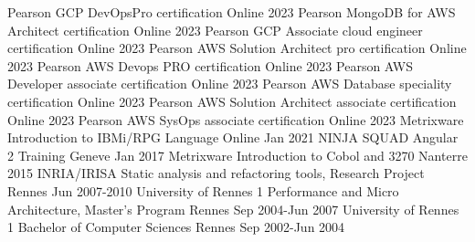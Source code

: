 
\begin{cventries}
\cventry
{Pearson} %
{GCP DevOpsPro certification} %
{Online} %
{2023} %
{
}\cventry
{Pearson} %
{MongoDB for AWS Architect certification} %
{Online} %
{2023} %
{
}\cventry
{Pearson} %
{GCP Associate cloud engineer certification} %
{Online} %
{2023} %
{
}
\cventry
{Pearson} %
{AWS Solution Architect pro certification} %
{Online} %
{2023} %
{
}
\cventry
{Pearson} %
{AWS Devops PRO certification} %
{Online} %
{2023} %
{
}
\cventry
{Pearson} %
{AWS Developer associate certification} %
{Online} %
{2023} %
{
}
\cventry
{Pearson} %
{AWS Database speciality certification} %
{Online} %
{2023} %
{
}
\cventry
{Pearson} %
{AWS Solution Architect associate certification} %
{Online} %
{2023} %
{
}
\cventry
{Pearson} %
{AWS SysOps associate certification} %
{Online} %
{2023} %
{
}
\cventry
{Metrixware} %
{Introduction to IBMi/RPG Language} %
{Online} %
{Jan 2021} %
{
}
\cventry
{NINJA SQUAD} %
{Angular 2 Training} %
{Geneve} %
{Jan 2017} %
{
}
\cventry
{Metrixware} %
{Introduction to Cobol and 3270} %
{Nanterre} %
{2015} %
{
}
\cventry
{INRIA/IRISA} %
{Static analysis and refactoring tools, Research Project} %
{Rennes} %
{Jun 2007-2010} %
{
}
\cventry
{University of Rennes 1} %
{Performance and Micro Architecture, Master's Program} %
{Rennes} %
{Sep 2004-Jun 2007} %
{
}
\cventry
{University of Rennes 1} %
{Bachelor of Computer Sciences} %
{Rennes} %
{Sep 2002-Jun 2004} %
{
}
\end{cventries}
